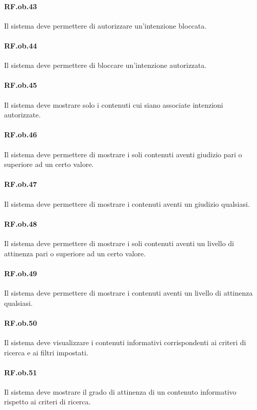 \documentclass[10pt,a4paper,headinclude,footinclude,hidelinks]{scrreprt} %
\begin{document}
	\paragraph{RF.ob.43} Il sistema deve permettere di autorizzare un'intenzione bloccata.

	\paragraph{RF.ob.44} Il sistema deve permettere di bloccare un'intenzione autorizzata.

	\paragraph{RF.ob.45} Il sistema deve mostrare solo i contenuti cui siano associate intenzioni autorizzate.

	\paragraph{RF.ob.46} Il sistema deve permettere di mostrare i soli contenuti aventi giudizio pari o superiore ad un certo valore.

	\paragraph{RF.ob.47} Il sistema deve permettere di mostrare i contenuti aventi un giudizio qualsiasi.

	\paragraph{RF.ob.48} Il sistema deve permettere di mostrare i soli contenuti aventi un livello di attinenza pari o superiore ad un certo valore.

	\paragraph{RF.ob.49} Il sistema deve permettere di mostrare i contenuti aventi un livello di attinenza qualsiasi.

	\paragraph{RF.ob.50} Il sistema deve visualizzare i contenuti informativi corrispondenti ai criteri di ricerca e ai filtri impostati.

	\paragraph{RF.ob.51} Il sistema deve mostrare il grado di attinenza di un contenuto informativo rispetto ai criteri di ricerca.
\end{document}
